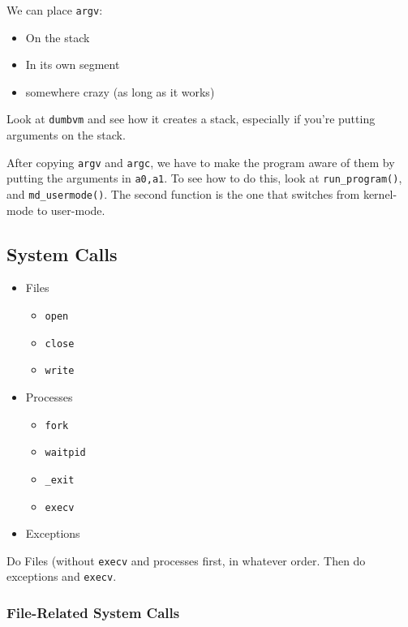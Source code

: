 \documentclass[12pt]{article}
\begin{document}
We can place \texttt{argv}:
\begin{itemize}
	\item On the stack
	\item In its own segment
	\item somewhere crazy (as long as it works)
\end{itemize}
Look at \texttt{dumbvm} and see how it creates a stack, especially if you're
putting arguments on the stack.

After copying \texttt{argv} and \texttt{argc}, we have to make the program aware
of them by putting the arguments in \texttt{a0,a1}. To see how to do this, look
at \texttt{run\_program()}, and \texttt{md\_usermode()}. The second function is
the one that switches from kernel-mode to user-mode.

\subsection{System Calls}

\begin{itemize}
	\item Files
		\begin{itemize}
			\item \texttt{open}
			\item \texttt{close}
			\item \texttt{write}
		\end{itemize}
	\item Processes
		\begin{itemize}
			\item \texttt{fork}
			\item \texttt{waitpid}
			\item \texttt{\_exit}
			\item \texttt{execv}
		\end{itemize}
	\item Exceptions
\end{itemize}

Do Files (without \texttt{execv} and processes first, in whatever order. Then do
exceptions and \texttt{execv}.

\subsubsection{File-Related System Calls}

\end{document}
